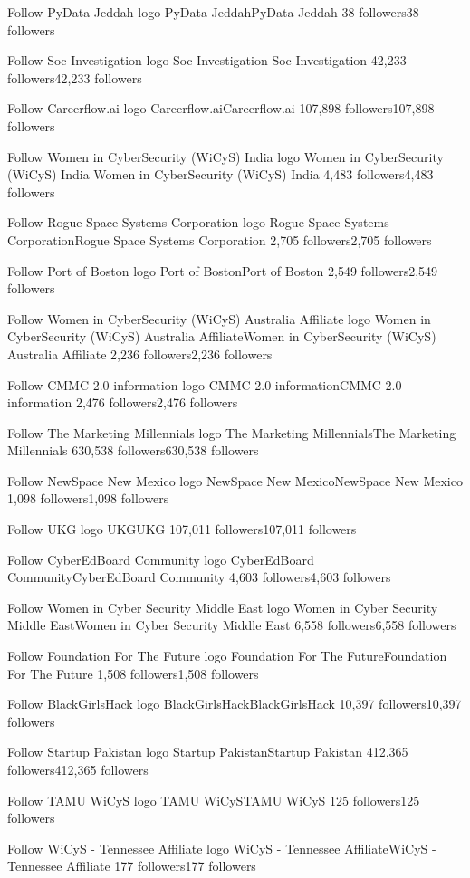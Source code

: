 Follow
PyData Jeddah logo
PyData JeddahPyData Jeddah
38 followers38 followers

Follow
Soc Investigation  logo
Soc Investigation Soc Investigation 
42,233 followers42,233 followers

Follow
Careerflow.ai logo
Careerflow.aiCareerflow.ai
107,898 followers107,898 followers

Follow
Women in CyberSecurity (WiCyS) India  logo
Women in CyberSecurity (WiCyS) India Women in CyberSecurity (WiCyS) India 
4,483 followers4,483 followers

Follow
Rogue Space Systems Corporation logo
Rogue Space Systems CorporationRogue Space Systems Corporation
2,705 followers2,705 followers

Follow
Port of Boston logo
Port of BostonPort of Boston
2,549 followers2,549 followers

Follow
Women in CyberSecurity (WiCyS) Australia Affiliate logo
Women in CyberSecurity (WiCyS) Australia AffiliateWomen in CyberSecurity (WiCyS) Australia Affiliate
2,236 followers2,236 followers

Follow
CMMC 2.0 information logo
CMMC 2.0 informationCMMC 2.0 information
2,476 followers2,476 followers

Follow
The Marketing Millennials logo
The Marketing MillennialsThe Marketing Millennials
630,538 followers630,538 followers

Follow
NewSpace New Mexico logo
NewSpace New MexicoNewSpace New Mexico
1,098 followers1,098 followers

Follow
UKG logo
UKGUKG
107,011 followers107,011 followers

Follow
CyberEdBoard Community logo
CyberEdBoard CommunityCyberEdBoard Community
4,603 followers4,603 followers

Follow
Women in Cyber Security Middle East logo
Women in Cyber Security Middle EastWomen in Cyber Security Middle East
6,558 followers6,558 followers

Follow
Foundation For The Future logo
Foundation For The FutureFoundation For The Future
1,508 followers1,508 followers

Follow
BlackGirlsHack logo
BlackGirlsHackBlackGirlsHack
10,397 followers10,397 followers

Follow
Startup Pakistan logo
Startup PakistanStartup Pakistan
412,365 followers412,365 followers

Follow
TAMU WiCyS logo
TAMU WiCySTAMU WiCyS
125 followers125 followers

Follow
WiCyS - Tennessee Affiliate logo
WiCyS - Tennessee AffiliateWiCyS - Tennessee Affiliate
177 followers177 followers

